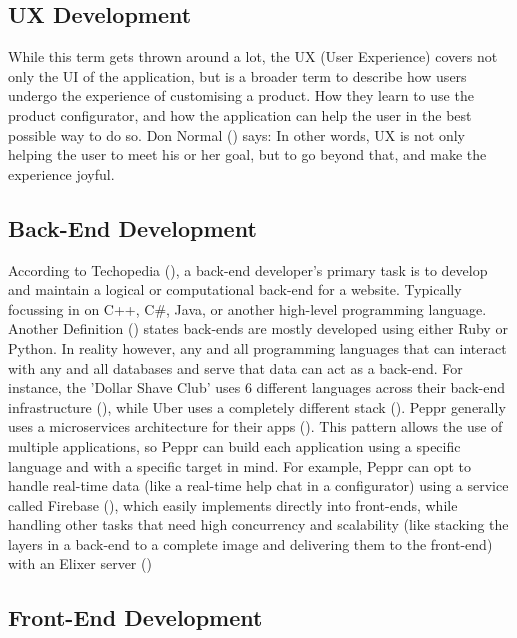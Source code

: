 \subsection{UX Development}
While this term gets thrown around a lot, the UX (User Experience) covers not only the UI of the application, but is a broader term to describe how users undergo the experience of customising a product. How they learn to use the product configurator, and how the application can help the user in the best possible way to do so. Don Normal (\cite{User Experience}) says: \newline
{} \newline
In other words, UX is not only helping the user to meet his or her goal, but to go beyond that, and make the experience joyful.

\subsection{Back-End Development}
According to Techopedia (\cite{Back-End Developer Definition}), a back-end developer's primary task is to develop and maintain a logical or computational back-end for a website. Typically focussing in on C++, C\#, Java, or another high-level programming language.
Another Definition (\cite{Back-End Developer Definition 02}) states back-ends are mostly developed using either Ruby or Python.
In reality however, any and all programming languages that can interact with any and all databases and serve that data can act as a back-end. For instance, the 'Dollar Shave Club' uses 6 different languages across their back-end infrastructure (\cite{Dollar Shave Club back-end}), while Uber uses a completely different stack (\cite{Uber back-end}).
Peppr generally uses a microservices architecture for their apps (\cite{Microservices}). This pattern allows the use of multiple applications, so Peppr can build each application using a specific language and with a specific target in mind. For example, Peppr can opt to handle real-time data (like a real-time help chat in a configurator) using a service called Firebase (\cite{Firebase}), which easily implements directly into front-ends, while handling other tasks that need high concurrency and scalability (like stacking the layers in a back-end to a complete image and delivering them to the front-end) with an Elixer server (\cite{Elixr})

\subsection{Front-End Development}


\newpage
